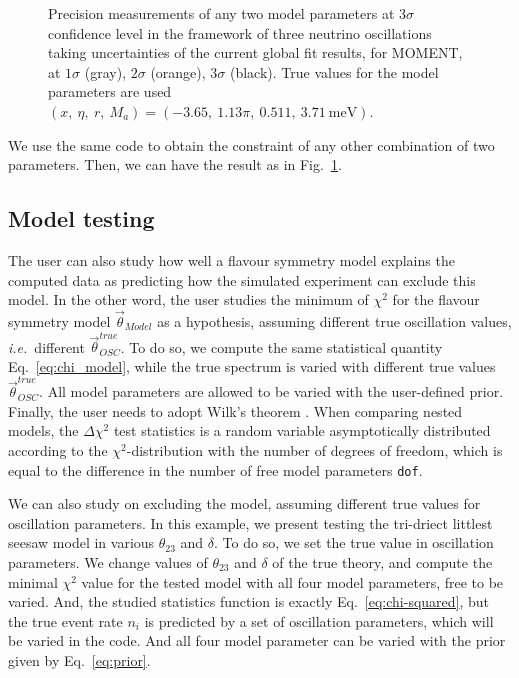\documentclass[aps,prd,nofootinbib,preprint]{revtex4}
\begin{document}
\begin{figure}[!h]
 \caption{\label{fig:model_2D}Precision measurements of any two model parameters at 3$\sigma$ confidence level in the framework of three neutrino oscillations taking uncertainties of the current global fit results, for MOMENT, at $1\sigma$ (gray), $2\sigma$ (orange), $3\sigma$ (black). True values for the model parameters are used $(x,~\eta,~r,~M_a)=(-3.65,~1.13\pi,~0.511,~3.71~\text{meV})$.}
\end{figure}


We use the same code to obtain the constraint of any other combination of two parameters. Then, we can have the result as in Fig.~\ref{fig:model_2D}.





\subsection{Model testing}

The user can also study how well a flavour symmetry model explains the computed data as predicting how the simulated experiment can exclude this model. In the other word, the user studies the minimum of $\chi^2$ for the flavour symmetry model $\vec{\theta}_{Model}$ as a hypothesis, assuming different true oscillation values, \textit{i.e.}~different $\vec{\theta}^{true}_{OSC}$. To do so, we compute the same statistical quantity Eq.~\ref{eq:chi_model}, while the true spectrum is varied with different true values $\vec{\theta}_{OSC}^{true}$. All model parameters are allowed to be varied with the user-defined prior.
%
Finally, the user needs to adopt Wilk's theorem \cite{Wilks:1938dza}. When comparing nested models, the $\Delta \chi^2$ test statistics is a random variable asymptotically distributed according to the $\chi^2$-distribution with the number of degrees of freedom, which is equal to the difference in the number of free model parameters \texttt{dof}. 


We can also study on excluding the model, assuming different true values for oscillation parameters. In this example, we present testing the tri-driect littlest seesaw model in various $\theta_{23}$ and $\delta$. To do so, we set the true value in oscillation parameters. We change values of $\theta_{23}$ and $\delta$ of the true theory, and compute the minimal $\chi^2$ value for the tested model with all four model parameters, free to be varied. And, the studied statistics function is exactly Eq.~\ref{eq:chi-squared}, but the true event rate $n_i$ is predicted by a set of oscillation parameters, which will be varied in the code. And all four model parameter can be varied with the prior given by Eq.~\ref{eq:prior}.
\end{document}
